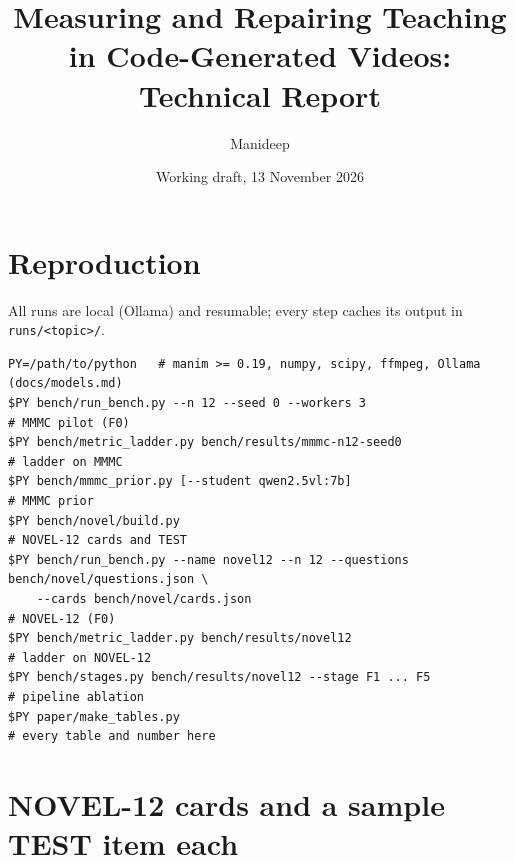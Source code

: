 \documentclass[11pt]{article}
\title{Measuring and Repairing Teaching in Code-Generated Videos:\\Technical Report}
\author{Manideep}
\date{Working draft, 13 November 2026}
\begin{document}
\maketitle
\tableofcontents














\appendix
\section{Reproduction}
All runs are local (Ollama) and resumable; every step caches its output in \texttt{runs/<topic>/}.
{\footnotesize
\begin{verbatim}
PY=/path/to/python   # manim >= 0.19, numpy, scipy, ffmpeg, Ollama (docs/models.md)
$PY bench/run_bench.py --n 12 --seed 0 --workers 3                      # MMMC pilot (F0)
$PY bench/metric_ladder.py bench/results/mmmc-n12-seed0                 # ladder on MMMC
$PY bench/mmmc_prior.py [--student qwen2.5vl:7b]                        # MMMC prior
$PY bench/novel/build.py                                                # NOVEL-12 cards and TEST
$PY bench/run_bench.py --name novel12 --n 12 --questions bench/novel/questions.json \
    --cards bench/novel/cards.json                                      # NOVEL-12 (F0)
$PY bench/metric_ladder.py bench/results/novel12                        # ladder on NOVEL-12
$PY bench/stages.py bench/results/novel12 --stage F1 ... F5             # pipeline ablation
$PY paper/make_tables.py                                                # every table and number here
\end{verbatim}}

\section{NOVEL-12 cards and a sample TEST item each}




\end{document}
